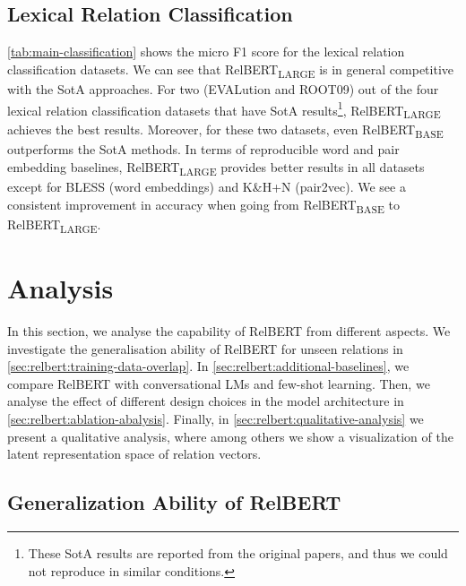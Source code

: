 \documentclass[3p]{elsarticle}
\begin{document}
{\subsection{Lexical Relation Classification}\label{sec:relbert:result-on-classification}
\autoref{tab:main-classification} shows the micro F1 score for the lexical relation classification datasets. We can see that RelBERT\textsubscript{LARGE} is in general competitive with the SotA approaches. For two (EVALution and ROOT09) out of the four lexical relation classification datasets that have SotA results\footnote{These SotA results are reported from the original papers, and thus we could not reproduce in similar conditions.}, RelBERT\textsubscript{LARGE} achieves the best results. Moreover, for these two datasets, even RelBERT\textsubscript{BASE} outperforms the SotA methods. In terms of reproducible word and pair embedding baselines, RelBERT\textsubscript{LARGE} provides better results in all datasets except for BLESS (word embeddings) and K\&H+N (pair2vec). We see a consistent improvement in accuracy when going from RelBERT\textsubscript{BASE} to RelBERT\textsubscript{LARGE}.


\section{Analysis} \label{sec:relbert:analysis}
In this section, we analyse the capability of RelBERT from different aspects. We investigate the generalisation ability of RelBERT for unseen relations in \autoref{sec:relbert:training-data-overlap}. In \autoref{sec:relbert:additional-baselines}, we compare RelBERT with conversational LMs and few-shot learning. Then, we analyse the effect of different design choices in the model architecture in \autoref{sec:relbert:ablation-abalysis}. Finally, in \autoref{sec:relbert:qualitative-analysis} we present a qualitative analysis, where among others we show a visualization of the latent representation space of relation vectors.

\subsection{Generalization Ability of RelBERT}\label{sec:relbert:training-data-overlap}



}
\end{document}
